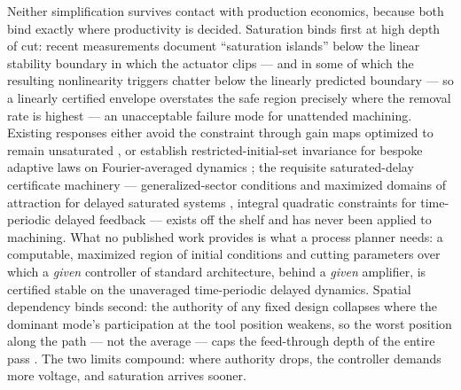 \documentclass[preprint,12pt]{elsarticle}
\begin{document}
Neither simplification survives contact with production economics,
because both bind exactly where productivity is decided. Saturation
binds first at high depth of cut: recent measurements document
``saturation islands'' below the linear stability boundary in which
the actuator clips --- and in some of which the resulting
nonlinearity triggers chatter below the linearly predicted boundary
\cite{ozsoy2025mssp} --- so a linearly certified envelope overstates the
safe region precisely where the removal rate is highest --- an
unacceptable failure mode for unattended machining. Existing responses
either avoid the constraint through gain maps optimized to remain
unsaturated \cite{jmp2026spindle}, or establish restricted-initial-set
invariance for bespoke adaptive laws on Fourier-averaged dynamics
\cite{wu2016adaptive}; the requisite saturated-delay certificate
machinery --- generalized-sector conditions and maximized domains of
attraction for delayed saturated systems
\cite{tarbouriech2011book,fu2013delay}, integral quadratic constraints
for time-periodic delayed feedback \cite{altshuller2008siam} ---
exists off the shelf and has never been applied to machining. What no
published work provides is what a process planner needs: a computable,
maximized region of initial conditions and cutting parameters over
which a \emph{given} controller of standard architecture, behind a
\emph{given} amplifier, is certified stable on the unaveraged
time-periodic delayed dynamics. Spatial dependency binds second: the
authority of any fixed design collapses where the dominant mode's
participation at the tool position weakens, so the worst position
along the path --- not the average --- caps the feed-through depth of
the entire pass \cite{companion}. The two limits compound: where
authority drops, the controller demands more voltage, and saturation
arrives sooner.
\end{document}
